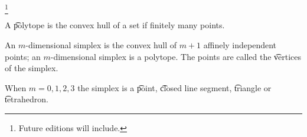 
\footnote{Future editions will include.}


A \t{polytope} is the convex hull of a set if finitely many points.

An \t{$m$-dimensional simplex} is the convex hull of $m+1$ affinely independent points; an $m$-dimensional simplex is a polytope.
The points are called the \t{vertices} of the simplex.

When $m = 0, 1, 2, 3$ the simplex is a \t{point}, \t{closed line segment}, \t{triangle} or \t{tetrahedron}.

\blankpage
